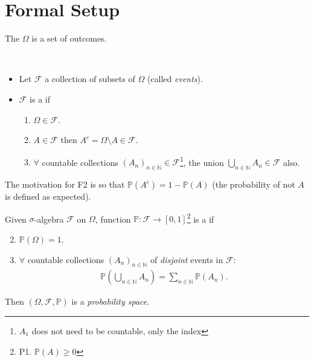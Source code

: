 \section{Formal Setup}

\begin{definition}
    The  $\Omega$ is a set of outcomes.
\end{definition} 

\begin{definition} ~\vspace*{-1.5\baselineskip}
    \begin{itemize}
        \item Let $\mathcal{F}$ a collection of subsets of $\Omega$ (called \emph{events}).
        \item $\mathcal{F}$ is a  if
        \begin{enumerate}[label=F\arabic*.]
            \item $\Omega\in \mathcal{F}$.
            \item $A\in\mathcal F$ then $A^c = \Omega \setminus A \in\mathcal F$.
            \item $\forall$ countable collections $(A_n)_{n\in\mathbb{N}}\in\mathcal F$\footnote{$A_1$ does not need to be countable, only the index}, the union $\bigcup_{n\in\mathbb{N}} A_n \in \mathcal F$ also.
        \end{enumerate}
    \end{itemize} 
\end{definition}

\begin{remark}
    The motivation for F2 is so that $\mathbb{P}(A^c) = 1 - \mathbb{P}(A)$ (the probability of not $A$ is defined as expected).
\end{remark} 

\begin{definition}
    Given $\sigma$-algebra $\mathcal{F}$ on $\Omega$, function $\mathbb{P}:\mathcal F \to [0,1]$\footnote{P1. $\mathbb{P}(A) \geq 0$} is a  if
    \begin{enumerate}[label=P\arabic*.] \setcounter{enumi}{1}
        \item $\mathbb{P}(\Omega)=1$.
        \item $\forall$ countable collections $(A_n)_{n \in \mathbb{N}}$ of \emph{disjoint} events in $\mathcal{F}$:
        \begin{align*}
            \mathbb{P}\left( \bigcup_{n\in\mathbb{N}} A_n \right) = \sum_{n\in\mathbb{N}}\mathbb{P}(A_n).
        \end{align*}
    \end{enumerate} 
    Then $(\Omega, \mathcal F,\mathbb{P})$ is a \emph{probability space}.
\end{definition} 

